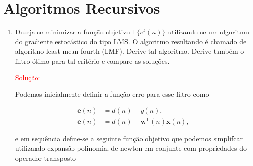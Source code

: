 \documentclass[a4paper,10pt]{article}
\begin{document}
	\newpage
	\section*{Algoritmos Recursivos}
	
		\begin{enumerate}
			
			\item Deseja-se minimizar a função objetivo $\mathbb{E}\{e^{4}(n)\}$ utilizando-se um algoritmo do gradiente estocástico do tipo LMS. O algoritmo resultando é chamado de algoritmo least mean fourth (LMF). Derive tal algoritmo. Derive também o ﬁltro ótimo para tal critério e compare as soluções.
			
				\textcolor{red}{Solução:}
				
				Podemos inicialmente definir a função erro para esse filtro como
				
				\begin{align}
					\mathbf{e}(n) &= d(n) - y(n), \\
					\mathbf{e}(n) &= d(n) - \mathbf{w}^{\text{T}}(n)\mathbf{x}(n),
				\end{align}
				
				e em sequência define-se a seguinte função objetivo que podemos simplifcar utilizando expansão polinomial de newton em conjunto com propriedades do operador transposto
				

\end{enumerate}
\end{document}
